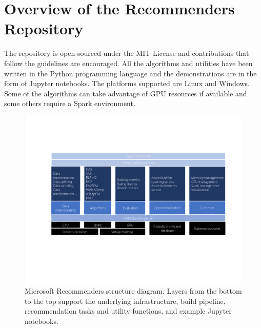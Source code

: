\section{Overview of the Recommenders Repository}

The repository is open-sourced under the MIT License and contributions that follow the guidelines are encouraged.  
All the algorithms and utilities have been written in the Python programming language and the demonstrations are 
in the form of Jupyter notebooks.
The platforms supported are Linux and Windows. Some of the algorithms can take advantage of GPU resources if available 
and some others require a Spark environment.

\begin{figure}
  \centering
  \includegraphics[width=\textwidth,keepaspectratio]{platform_diagram_crop.pdf}
  \caption{Microsoft Recommenders structure diagram. Layers from the bottom to the top support the underlying 
  infrastructure, build pipeline, recommendation tasks and utility functions, and example Jupyter notebooks.}
\end{figure}

%
%
